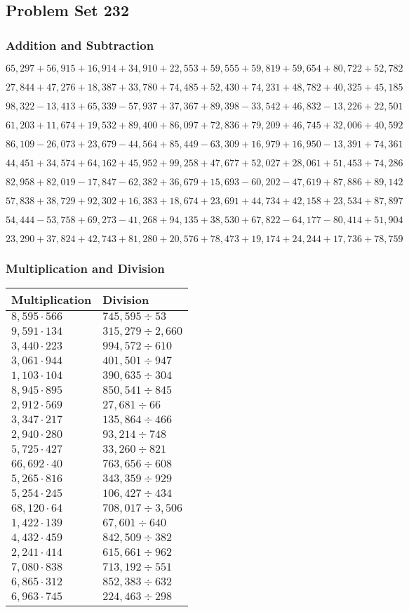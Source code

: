 \hypertarget{problem-set-232}{%
\subsection{Problem Set 232}\label{problem-set-232}}

\hypertarget{addition-and-subtraction}{%
\subsubsection{Addition and
Subtraction}\label{addition-and-subtraction}}

\(65,297+56,915+16,914+34,910+22,553+59,555+59,819+59,654+80,722+52,782\)

\(27,844+47,276+18,387+33,780+74,485+52,430+74,231+48,782+40,325+45,185\)

\(98,322-13,413+65,339-57,937+37,367+89,398-33,542+46,832-13,226+22,501\)

\(61,203+11,674+19,532+89,400+86,097+72,836+79,209+46,745+32,006+40,592\)

\(86,109-26,073+23,679-44,564+85,449-63,309+16,979+16,950-13,391+74,361\)

\(44,451+34,574+64,162+45,952+99,258+47,677+52,027+28,061+51,453+74,286\)

\(82,958+82,019-17,847-62,382+36,679+15,693-60,202-47,619+87,886+89,142\)

\(57,838+38,729+92,302+16,383+18,674+23,691+44,734+42,158+23,534+87,897\)

\(54,444-53,758+69,273-41,268+94,135+38,530+67,822-64,177-80,414+51,904\)

\(23,290+37,824+42,743+81,280+20,576+78,473+19,174+24,244+17,736+78,759\)

\hypertarget{multiplication-and-division}{%
\subsubsection{Multiplication and
Division}\label{multiplication-and-division}}

\begin{longtable}[]{@{}ll@{}}
\toprule
Multiplication & Division\tabularnewline
\midrule
\endhead
\(8,595\cdot566\) & \(745,595÷53\)\tabularnewline
\(9,591\cdot134\) & \(315,279 ÷2,660\)\tabularnewline
\(3,440\cdot223\) & \(994,572÷610\)\tabularnewline
\(3,061\cdot944\) & \(401,501÷947\)\tabularnewline
\(1,103\cdot104\) & \(390,635÷304\)\tabularnewline
\(8,945\cdot895\) & \(850,541÷845\)\tabularnewline
\(2,912\cdot569\) & \(27,681÷66\)\tabularnewline
\(3,347\cdot217\) & \(135,864÷466\)\tabularnewline
\(2,940\cdot280\) & \(93,214÷748\)\tabularnewline
\(5,725\cdot427\) & \(33,260÷821\)\tabularnewline
\(66,692\cdot40\) & \(763,656÷608\)\tabularnewline
\(5,265\cdot816\) & \(343,359÷929\)\tabularnewline
\(5,254\cdot245\) & \(106,427÷434\)\tabularnewline
\(68,120\cdot64\) & \(708,017÷3,506\)\tabularnewline
\(1,422\cdot139\) & \(67,601÷640\)\tabularnewline
\(4,432\cdot459\) & \(842,509÷382\)\tabularnewline
\(2,241\cdot414\) & \(615,661÷962\)\tabularnewline
\(7,080\cdot838\) & \(713,192÷551\)\tabularnewline
\(6,865\cdot312\) & \(852,383÷632\)\tabularnewline
\(6,963\cdot745\) & \(224,463÷298\)\tabularnewline
\bottomrule
\end{longtable}
